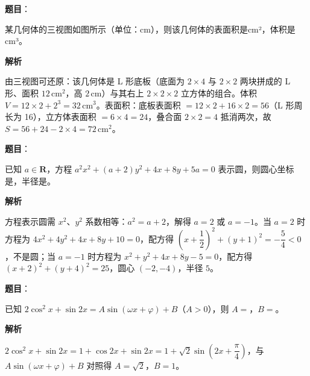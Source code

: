 \begin{answer}

\textbf{题目}：

某几何体的三视图如图所示（单位：cm），则该几何体的表面积是\gkblank{}cm²，体积是\gkblank{}cm³。
\nopagebreak[4]
\begin{center}\end{center}
\nopagebreak[4]
\textbf{解析}

由三视图可还原：该几何体是 L 形底板（底面为 \(2\times4\) 与 \(2\times2\) 两块拼成的 L 形、面积 \(12\,\mathrm{cm}^{2}\)，高 \(2\,\mathrm{cm}\)）与其右上 \(2\times2\times2\) 立方体的组合。体积 \(V=12\times2+2^{3}=32\,\mathrm{cm}^{3}\)。表面积：底板表面积 \(=12\times2+16\times2=56\)（L 形周长为 16），立方体表面积 \(=6\times4=24\)，叠合面 \(2\times2=4\) 抵消两次，故 \(S=56+24-2\times4=72\,\mathrm{cm}^{2}\)。


\end{answer}
\begin{answer}

\textbf{题目}：

已知 \(a\in\mathbf{R}\)，方程 \(a^{2}x^{2}+(a+2)y^{2}+4x+8y+5a=0\) 表示圆，则圆心坐标是\gkblank{}，半径是\gkblank{}。

\textbf{解析}

方程表示圆需 \(x^{2}\)、\(y^{2}\) 系数相等：\(a^{2}=a+2\)，解得 \(a=2\) 或 \(a=-1\)。当 \(a=2\) 时方程为 \(4x^{2}+4y^{2}+4x+8y+10=0\)，配方得 \((x+\dfrac{1}{2})^{2}+(y+1)^{2}=-\dfrac{5}{4}<0\)，不是圆；当 \(a=-1\) 时方程为 \(x^{2}+y^{2}+4x+8y-5=0\)，配方得 \((x+2)^{2}+(y+4)^{2}=25\)，圆心 \((-2,-4)\)，半径 \(5\)。


\end{answer}
\begin{answer}

\textbf{题目}：

已知 \(2\cos^{2}x+\sin 2x=A\sin(\omega x+\varphi)+B\)（\(A>0\)），则 \(A=\)\gkblank{}，\(B=\)\gkblank{}。

\textbf{解析}

\(2\cos^{2}x+\sin 2x=1+\cos 2x+\sin 2x=1+\sqrt{2}\sin\left(2x+\dfrac{\pi}{4}\right)\)，与 \(A\sin(\omega x+\varphi)+B\) 对照得 \(A=\sqrt{2}\)，\(B=1\)。


\end{answer}
